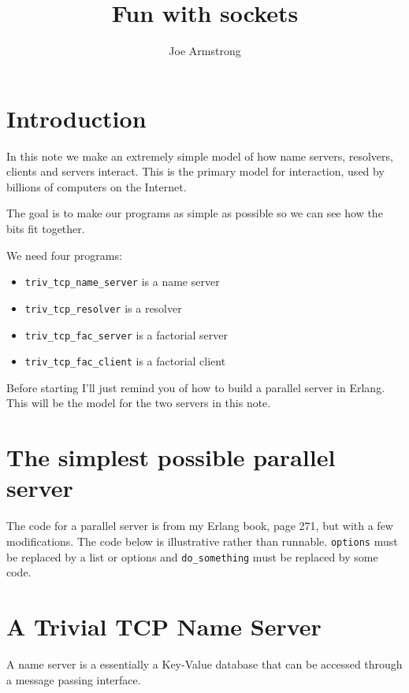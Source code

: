 \documentclass[12pt]{article}
\title{Fun with sockets}
\author{Joe Armstrong}
\begin{document}
\maketitle

\tableofcontents

\section{Introduction}

In this note we make an extremely simple model of how name servers,
resolvers, clients and servers interact. This is the primary model for
interaction, used by billions of computers on the Internet.

The goal is to make our programs as simple as possible so we can see
how the bits fit together. 

We need four programs:

\begin{itemize}
\item \verb+triv_tcp_name_server+ is a name server
\item \verb+triv_tcp_resolver+ is a resolver
\item \verb+triv_tcp_fac_server+ is a factorial server
\item \verb+triv_tcp_fac_client+ is a factorial client
\end{itemize}

Before starting I'll just remind you of how to build a 
parallel server in Erlang. This will be the model for the
two servers in this note.

\section{The simplest possible parallel server}

The code for a parallel server  is from my Erlang book, page 271, but with a few
modifications.  The code below is illustrative rather than runnable.
\verb+options+ must be replaced by a list or options
and \verb+do_something+ must be replaced by some code.


\section{A Trivial TCP Name Server}

A name server is a essentially a Key-Value database 
that can be accessed through a message passing interface.
\end{document}
